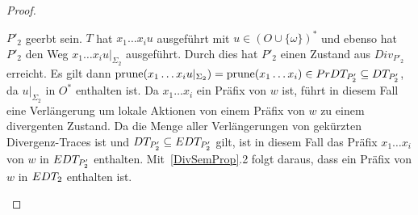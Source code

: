 \begin{proof}
\begin{itemize}
\begin{itemize}
          $P'_2$ geerbt sein. $T$ hat $x_1\dots x_iu$ ausgeführt mit $u\in (O
          \cup \{\omega\})^*$ und ebenso hat $P'_2$ den Weg $x_1\dots
          x_iu|_{\Sigma _2}$ ausgeführt. Durch dies hat $P'_2$ einen Zustand
          aus $Div_{P'_2}$ erreicht. Es gilt dann $\mathrm{prune} (x_1\dots
          x_iu|_{\Sigma _2}) = \mathrm{prune} (x_1\dots x_i)\in PrDT _{P'_2} \subseteq
          DT _{P'_2}$, da $u|_{\Sigma _2}$ in $O^*$ enthalten ist. Da
          $x_1\dots x_i$ ein Präfix von $w$ ist, führt in diesem Fall eine
          Verlängerung um lokale Aktionen von einem Präfix von $w$ zu einem
          divergenten Zustand. Da \DT{} die Menge aller Verlängerungen von
          gekürzten Divergenz-Traces ist und $DT _{P'_2}\subseteq EDT
          _{P'_2}$ gilt, ist in diesem Fall das Präfix $x_1\dots x_i$ von $w$
          in $EDT _{P'_2}$ enthalten. Mit~\ref{DivSemProp}.2 folgt daraus,
          dass ein Präfix von $w$ in $EDT _2$ enthalten ist.
      \end{itemize}
  \end{itemize}


\end{proof}
